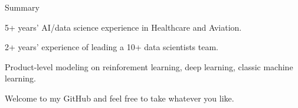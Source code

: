 \documentclass{resume} %
\begin{document}

\begin{rSection}{Summary} 

\begin{rSubsection}{}{}{}{}
\item 5+ years' AI/data science experience in Healthcare and Aviation.
\item 2+ years' experience of leading a 10+ data scientists team.
\item Product-level modeling on reinforement learning, deep learning, classic machine learning.
\item Welcome to my GitHub and feel free to take whatever you like.
\end{rSubsection}


\end{rSection}

\end{document}
